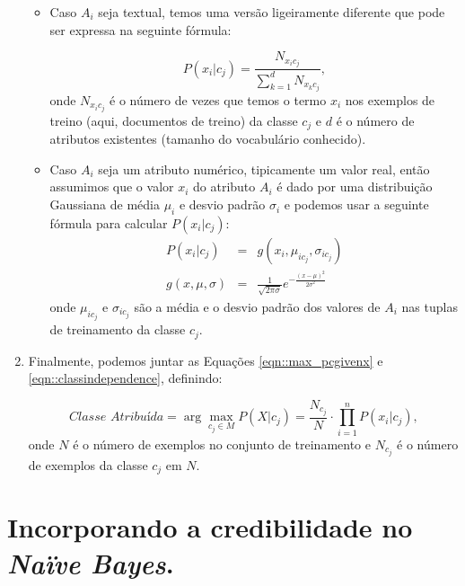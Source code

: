 \begin{enumerate}
\begin{itemize}
        \item Caso $A_i$ seja textual, temos uma versão ligeiramente diferente que pode ser expressa na seguinte fórmula:

    \begin{equation}\label{eqn::nbcattexto}
        P(x_i|c_j) = \frac{ N_{x_{i}c_{j}} }{ \sum\limits^{d}_{k = 1} { } N_{x_{k}c_{j}} },
    \end{equation}
        onde $N_{x_{i}c_{j}}$ é o número de vezes que temos o termo $x_i$ nos exemplos de treino (aqui, documentos de treino) da classe $c_j$ e $d$ é o número de atributos existentes (tamanho do vocabulário conhecido).

        \item Caso $A_i$ seja um atributo numérico, tipicamente um valor real, então assumimos que o valor $x_i$ do atributo $A_i$ é dado por uma distribuição Gaussiana de média $\mu_i$ e desvio padrão $\sigma_i$ e podemos usar a seguinte fórmula para calcular $P(x_i|c_j)$:
    \begin{eqnarray}\label{eqn::nbnumerico}
        P(x_i|c_j) & = & g(x_i, \mu_{ic_j}, \sigma_{ic_j})  \\
        g(x, \mu, \sigma) & = & \frac {1} { \sqrt{2\pi\sigma} } e^{ -\frac{(x-\mu)^2}{2\sigma^2}  } 
    \end{eqnarray}
        onde $\mu_{ic_j}$ e $\sigma_{ic_j}$ são a média e o desvio padrão dos valores de $A_i$ nas tuplas de treinamento da classe $c_j$. 

    \end{itemize}

    \item Finalmente, podemos juntar as Equações \ref{eqn::max_pcgivenx} e \ref{eqn::classindependence}, definindo:

    \begin{equation}\label{eqn::nbfinal}
    \textit{Classe Atribuída} = \arg\max_{c_j \in M}P(X|c_j) = \frac{N_{c_j}}{N} \cdot {\prod^{n}_{i=1}{P(x_i|c_j) }},
    \end{equation}
    onde $N$ é o número de exemplos no conjunto de treinamento e $N_{c_j}$ é o número de exemplos da classe $c_j$ em $N$.


\end{enumerate}


\section{Incorporando a credibilidade no \textit{Naïve Bayes}.}
\label{subsubsec::nb_cred}

